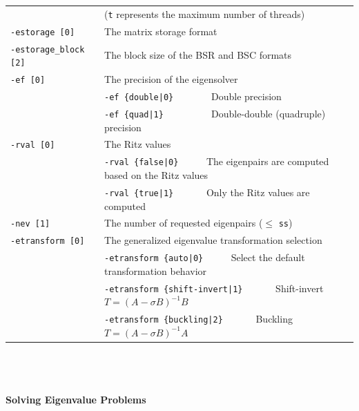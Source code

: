 \documentclass[a4paper]{article}
\begin{document}
\begin{minipage}[t]{\textwidth}
\begin{center}
\begin{tabular}{l|ll}
                            & (\verb=t= represents the maximum number of
 threads) \\
\verb=-estorage [0]=   & The matrix storage format \\
\verb=-estorage_block [2]=& The block size of the BSR and BSC formats\\ 
\verb=-ef [0]=         & The precision of the eigensolver\\
                       & \verb=-ef {double|0}       =  Double precision \\ 
                       & \verb=-ef {quad|1}         =  Double-double (quadruple) precision \\
\verb=-rval [0]=       & The Ritz values \\
                       & \verb=-rval {false|0}     =  The eigenpairs are computed based on the Ritz values \\
                       & \verb=-rval {true|1}      =  Only the Ritz values are computed \\
\verb=-nev [1]=        & The number of requested eigenpairs ($\le$ \verb=ss=) \\
\verb=-etransform [0]=       & The generalized eigenvalue transformation selection \\
                       & \verb=-etransform {auto|0}     =  Select the default transformation behavior \\
                       & \verb=-etransform {shift-invert|1}      =  Shift-invert $T = (A - \sigma B)^{-1}B$ \\
                       & \verb=-etransform {buckling|2}      =  Buckling $T = (A - \sigma B)^{-1}A$ \\
\hline         
\end{tabular}
\end{center}
\end{minipage}
\\ \\ \\
\noindent
{\bf Solving Eigenvalue Problems}
\end{document}
